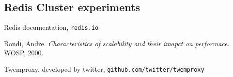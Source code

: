 \documentclass[11pt]{article}
\begin{document}
\pagebreak
\subsection*{Redis Cluster experiments}



\pagebreak
\begin{thebibliography}{9}

Redis documentation,
\texttt{redis.io}
        
Bondi, Andre.
\textit{Characteristics of scalability and their imapct on performace.}
WOSP, 2000.

Twemproxy, developed by twitter,
\texttt{github.com/twitter/twemproxy}

\end{thebibliography}
\end{document}
